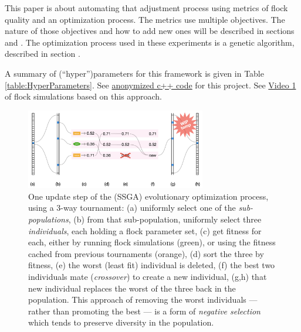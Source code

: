 \documentclass[letterpaper]{article}
\begin{document}
This paper is about automating that adjustment process using metrics of flock quality and an optimization process. The metrics use multiple objectives. The nature of those objectives and how to add new ones will be described in sections  and . The optimization process used in these experiments is a genetic algorithm, described in section .

A summary of (``hyper'')parameters for this framework is given in Table \ref{table:HyperParameters}. See \href{https://anonymous.4open.science/r/evoflock-9B09/}{anonymized c++ code} for this project. See \href{https://drive.google.com/file/d/1ZbanvWVfapnH2TpTqamypWFoXuMeoY9b/view?usp=sharing}{Video 1} of flock simulations based on this approach.


\begin{figure}[]
    \centering
    \includegraphics[width=0.7\textwidth]{images/temp_evo_update.png}
    \caption{One update step of the (SSGA) evolutionary optimization process, using a 3-way tournament: (a) uniformly select one of the \textit{sub-populations}, (b) from that sub-population, uniformly select three \textit{individuals}, each holding a flock parameter set, (c) get fitness for each, either by running flock simulations (green), or using the fitness cached from previous tournaments (orange), (d) sort the three by fitness, (e) the worst (least fit) individual is deleted, (f) the best two individuals mate (\textit{crossover}) to create a new individual, (g,h) that new individual replaces the worst of the three back in the population. This approach of removing the worst individuals --- rather than promoting the best --- is a form of \textit{negative selection} which tends to preserve diversity in the population.}
    \label{fig:temp_evo_update}
\end{figure}

\end{document}
